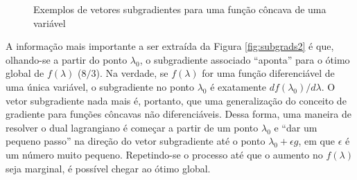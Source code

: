 {\begin{figure}[htpb!]
{{
}

	\label{fig:subgrads2}
}

	\caption{Exemplos de vetores subgradientes para uma função côncava de uma variável}
	\label{fig:exemplosSubrad}
\end{figure}

A informação mais importante a ser extraída da Figura \ref{fig:subgrads2} é que, olhando-se a partir do ponto $\lambda_0$, o subgradiente associado ``aponta'' para o ótimo global de $f(\lambda)$ ($8/3$). Na verdade, se $f(\lambda)$ for uma função diferenciável de uma única variável, o subgradiente no ponto  $\lambda_0$ é exatamente $df(\lambda_0)/d\lambda$. O vetor subgradiente nada mais é, portanto, que uma generalização do conceito de gradiente para funções côncavas não diferenciáveis. Dessa forma, uma maneira de resolver o dual lagrangiano é começar a partir de um ponto $\lambda_0$ e ``dar um pequeno passo'' na direção do vetor subgradiente até o ponto $\lambda_0 + \epsilon g$, em que $\epsilon$ é um número muito pequeno. Repetindo-se o processo até que o aumento no $f(\lambda)$ seja marginal, é possível chegar ao ótimo global. 

}
